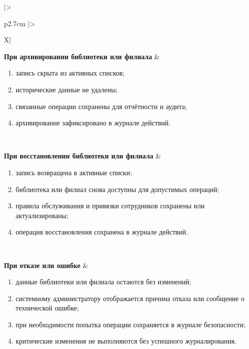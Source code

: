\documentclass[12pt,a4paper]{article}
\begin{document}
\begin{xltabular}{\textwidth}{
				|>{\raggedright\arraybackslash}p{2.7cm}
				|>{\raggedright\arraybackslash}X|
			}
			\textbf{При архивировании библиотеки или филиала} &
			\begin{enumerate}
				\item запись скрыта из активных списков;
				\item исторические данные не удалены;
				\item связанные операции сохранены для отчётности и аудита;
				\item архивирование зафиксировано в журнале действий.
			\end{enumerate} \\
			\hline
			
			\textbf{При восстановлении библиотеки или филиала} &
			\begin{enumerate}
				\item запись возвращена в активные списки;
				\item библиотека или филиал снова доступны для допустимых операций;
				\item правила обслуживания и привязки сотрудников сохранены или
				актуализированы;
				\item операция восстановления сохранена в журнале действий.
			\end{enumerate} \\
			\hline
			
			\textbf{При отказе или ошибке} &
			\begin{enumerate}
				\item данные библиотеки или филиала остаются без изменений;
				\item системному администратору отображается причина отказа или
				сообщение о технической ошибке;
				\item при необходимости попытка операции сохраняется в журнале
				безопасности;
				\item критические изменения не выполняются без успешного
				журналирования.
			\end{enumerate} \\
			\hline
			
		\end{xltabular}
		
		\label{tab:uc-library-management-specification}
		
\end{document}
